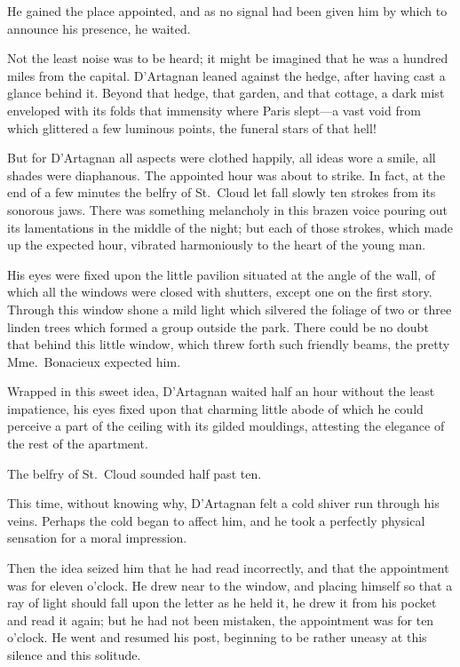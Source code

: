 He gained the place appointed, and as no signal had been given him by which to announce his presence, he waited. 

Not the least noise was to be heard; it might be imagined that he was a hundred miles from the capital. D'Artagnan leaned against the hedge, after having cast a glance behind it. Beyond that hedge, that garden, and that cottage, a dark mist enveloped with its folds that immensity where Paris slept—a vast void from which glittered a few luminous points, the funeral stars of that hell! 

But for D'Artagnan all aspects were clothed happily, all ideas wore a smile, all shades were diaphanous. The appointed hour was about to strike. In fact, at the end of a few minutes the belfry of St.~Cloud let fall slowly ten strokes from its sonorous jaws. There was something melancholy in this brazen voice pouring out its lamentations in the middle of the night; but each of those strokes, which made up the expected hour, vibrated harmoniously to the heart of the young man. 

His eyes were fixed upon the little pavilion situated at the angle of the wall, of which all the windows were closed with shutters, except one on the first story. Through this window shone a mild light which silvered the foliage of two or three linden trees which formed a group outside the park. There could be no doubt that behind this little window, which threw forth such friendly beams, the pretty Mme.~Bonacieux expected him. 

Wrapped in this sweet idea, D'Artagnan waited half an hour without the least impatience, his eyes fixed upon that charming little abode of which he could perceive a part of the ceiling with its gilded mouldings, attesting the elegance of the rest of the apartment. 

The belfry of St.~Cloud sounded half past ten. 

This time, without knowing why, D'Artagnan felt a cold shiver run through his veins. Perhaps the cold began to affect him, and he took a perfectly physical sensation for a moral impression. 

Then the idea seized him that he had read incorrectly, and that the appointment was for eleven o'clock. He drew near to the window, and placing himself so that a ray of light should fall upon the letter as he held it, he drew it from his pocket and read it again; but he had not been mistaken, the appointment was for ten o'clock. He went and resumed his post, beginning to be rather uneasy at this silence and this solitude. 

